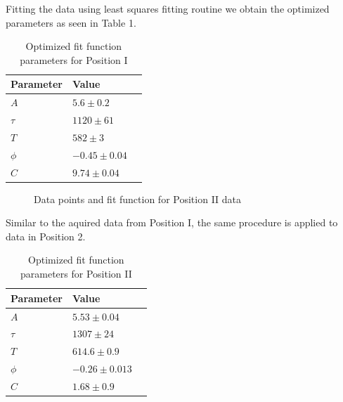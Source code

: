 \documentclass[twoside,twocolumn]{article}
\begin{document}
Fitting the data using least squares fitting routine we obtain the optimized
parameters as seen in Table 1.

\begin{table}[H]
\centering
\begin{tabular}{llr}
\toprule
\cmidrule(r){1-2}
Parameter & Value \\
\midrule
$ A$ & $ 5.6 \pm 0.2 $ \\
$ \tau$ & $ 1120 \pm 61 $ \\
$ T$ & $ 582 \pm 3 $ \\
$ \phi$ & $ -0.45 \pm 0.04 $ \\
$ C$ & $ 9.74 \pm 0.04 $ \\
\bottomrule
\end{tabular}
\caption{Optimized fit function parameters for Position I}
\end{table}

\begin{figure}[H]
\centering
  \begin{center}
  \end{center}
  \caption{Data points and fit function for Position II data}
\end{figure}
\label{fig:pos2_plot}

Similar to the aquired data from Position I, the same procedure is applied to data in Position 2.

\begin{table}[H]
\caption{Optimized fit function parameters for Position II}
\centering
\begin{tabular}{llr}
\toprule
\cmidrule(r){1-2}
Parameter & Value \\
\midrule
$ A$ & $ 5.53 \pm 0.04 $ \\
$ \tau$ & $ 1307 \pm 24 $ \\
$ T$ & $ 614.6 \pm 0.9 $ \\
$ \phi$ & $ -0.26 \pm 0.013 $ \\
$ C$ & $ 1.68 \pm 0.9 $ \\
\bottomrule
\end{tabular}
\end{table}
\end{document}
